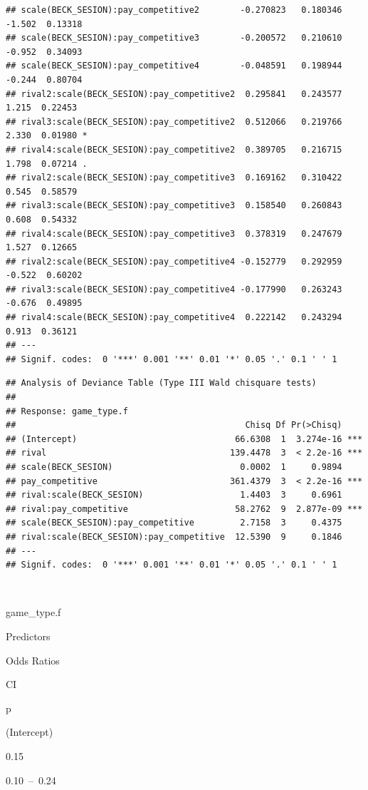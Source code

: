 \documentclass[
]{article}
\begin{document}
\begin{verbatim}
## scale(BECK_SESION):pay_competitive2        -0.270823   0.180346  -1.502  0.13318    
## scale(BECK_SESION):pay_competitive3        -0.200572   0.210610  -0.952  0.34093    
## scale(BECK_SESION):pay_competitive4        -0.048591   0.198944  -0.244  0.80704    
## rival2:scale(BECK_SESION):pay_competitive2  0.295841   0.243577   1.215  0.22453    
## rival3:scale(BECK_SESION):pay_competitive2  0.512066   0.219766   2.330  0.01980 *  
## rival4:scale(BECK_SESION):pay_competitive2  0.389705   0.216715   1.798  0.07214 .  
## rival2:scale(BECK_SESION):pay_competitive3  0.169162   0.310422   0.545  0.58579    
## rival3:scale(BECK_SESION):pay_competitive3  0.158540   0.260843   0.608  0.54332    
## rival4:scale(BECK_SESION):pay_competitive3  0.378319   0.247679   1.527  0.12665    
## rival2:scale(BECK_SESION):pay_competitive4 -0.152779   0.292959  -0.522  0.60202    
## rival3:scale(BECK_SESION):pay_competitive4 -0.177990   0.263243  -0.676  0.49895    
## rival4:scale(BECK_SESION):pay_competitive4  0.222142   0.243294   0.913  0.36121    
## ---
## Signif. codes:  0 '***' 0.001 '**' 0.01 '*' 0.05 '.' 0.1 ' ' 1
\end{verbatim}

\begin{verbatim}
## Analysis of Deviance Table (Type III Wald chisquare tests)
## 
## Response: game_type.f
##                                             Chisq Df Pr(>Chisq)    
## (Intercept)                               66.6308  1  3.274e-16 ***
## rival                                    139.4478  3  < 2.2e-16 ***
## scale(BECK_SESION)                         0.0002  1     0.9894    
## pay_competitive                          361.4379  3  < 2.2e-16 ***
## rival:scale(BECK_SESION)                   1.4403  3     0.6961    
## rival:pay_competitive                     58.2762  9  2.877e-09 ***
## scale(BECK_SESION):pay_competitive         2.7158  3     0.4375    
## rival:scale(BECK_SESION):pay_competitive  12.5390  9     0.1846    
## ---
## Signif. codes:  0 '***' 0.001 '**' 0.01 '*' 0.05 '.' 0.1 ' ' 1
\end{verbatim}

~

game\_type.f

Predictors

Odds Ratios

CI

p

(Intercept)

0.15

0.10~--~0.24
\end{document}

